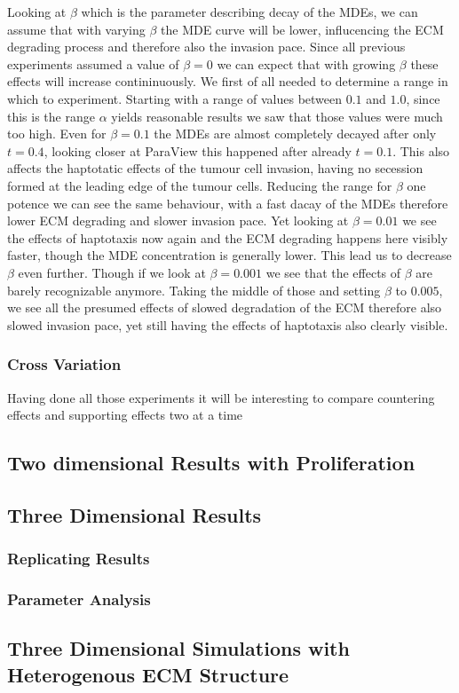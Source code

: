 Looking at $\beta$ which is the parameter describing decay of the MDEs, we can assume that with varying $\beta$ the MDE curve will be lower, influcencing the ECM degrading process and therefore also the invasion pace. Since all previous experiments assumed a value of $\beta=0$ we can expect that with growing $\beta$ these effects will increase contininuously. We first of all needed to determine a range in which to experiment. Starting with a range of values between $0.1$ and $1.0$, since this is the range $\alpha$ yields reasonable results we saw that those values were much too high. Even for $\beta=0.1$ the MDEs are almost completely decayed after only $t=0.4$, looking closer at ParaView this happened after already $t=0.1$. This also affects the haptotatic effects of the tumour cell invasion, having no secession formed at the leading edge of the tumour cells. Reducing the range for $\beta$ one potence we can see the same behaviour, with a fast dacay of the MDEs therefore lower ECM degrading and slower invasion pace. Yet looking at $\beta=0.01$ we see the effects of haptotaxis now again and the ECM degrading happens here visibly faster, though the MDE concentration is generally lower. This lead us to decrease $\beta$ even further. Though if we look at $\beta=0.001$ we see that the effects of $\beta$ are barely recognizable anymore. Taking the middle of those and setting $\beta$ to $0.005$, we see all the presumed effects of slowed degradation of the ECM therefore also slowed invasion pace, yet still having the effects of haptotaxis also clearly visible.

\subsubsection*{Cross Variation}
Having done all those experiments it will be interesting to compare countering effects and supporting effects two at a time


\subsection{Two dimensional Results with Proliferation}


\subsection{Three Dimensional Results}
\subsubsection{Replicating Results}
\subsubsection{Parameter Analysis}
\subsection{Three Dimensional Simulations with Heterogenous ECM Structure}